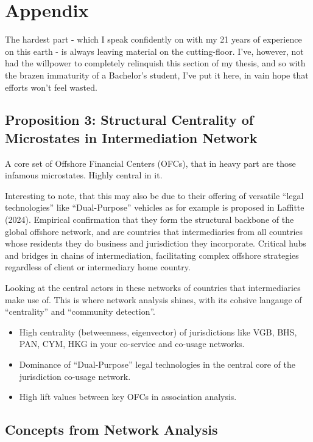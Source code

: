 \chapter{Appendix}
\label{chap:appendix}

The hardest part - which I speak confidently on with my 21 years of experience on this earth - is always leaving material on the cutting-floor. I've, however, not had the willpower to completely relinquish this section of my thesis, and so with the brazen immaturity of a Bachelor's student, I've put it here, in vain hope that efforts won't feel wasted. 

\section{Proposition 3: Structural Centrality of Microstates in Intermediation Network}
A core set of Offshore Financial Centers (OFCs), that in heavy part are those infamous microstates. Highly central in it.

Interesting to note, that this may also be due to their offering of versatile ``legal technologies'' like ``Dual-Purpose'' vehicles as for example is proposed in Laffitte (2024). Empirical confirmation that they form the structural backbone of the global offshore network, and are countries that intermediaries from all countries whose residents they do business and jurisdiction they incorporate. Critical hubs and bridges in chains of intermediation, facilitating complex offshore strategies regardless of client or intermediary home country.

Looking at the central actors in these networks of countries that intermediaries make use of. This is where network analysis shines, with its cohsive langauge of ``centrality'' and ``community detection''.

\begin{itemize}
\item High centrality (betweenness, eigenvector) of jurisdictions like VGB, BHS, PAN, CYM, HKG in your co-service and co-usage networks.
\item Dominance of ``Dual-Purpose'' legal technologies in the central core of the jurisdiction co-usage network.
\item High lift values between key OFCs in association analysis.
\end{itemize}

\section{Concepts from Network Analysis}
\label{subsec:network_theory_concepts}

